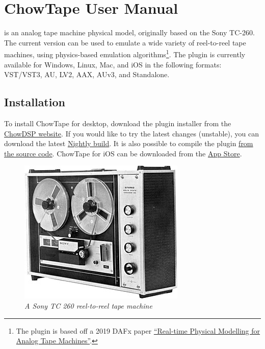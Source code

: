 \documentclass[landscape,twocolumn,a5paper]{manual}
\begin{document}
\section{ChowTape User Manual}

\noindent
{} is an analog tape machine physical model,
originally based on the Sony TC-260. The current version
can be used to emulate a wide variety of reel-to-reel tape
machines, using physics-based emulation algorithms\footnote{The
plugin is based off a 2019 DAFx paper \href{http://dafx2019.bcu.ac.uk/papers/DAFx2019_paper_3.pdf}{``Real-time Physical Modelling for Analog Tape Machines''}.}.
The plugin is currently available for Windows, Linux, Mac, and iOS
in the following formats: VST/VST3, AU, LV2,
AAX, AUv3, and Standalone.

\subsection{Installation}
To install ChowTape for desktop, download the plugin installer
from the \href{https://chowdsp.com/products.html#tape}{ChowDSP website}.
If you would like to try the latest changes (unstable), you can
download the latest \href{https://chowdsp.com/nightly.html}{Nightly build}.
It is also possible to compile the plugin
\href{https://github.com/jatinchowdhury18/AnalogTapeModel/blob/master/BUILDING.md}{from the source code}.
ChowTape for iOS can be downloaded from the
\href{https://apps.apple.com/us/app/chowtapemodel/id1557806564}{App Store}.

\begin{figure}[ht]
    \center
    \includegraphics[width=0.45\columnwidth]{sony_tc-260.jpg}
    \caption{\label{TapeMachine}{\it A Sony TC 260 reel-to-reel tape machine}}
\end{figure}
\end{document}
